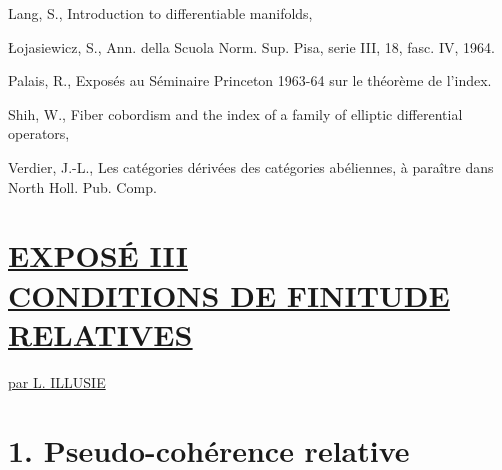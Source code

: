 \documentclass[11pt]{article}
\newcommand{\Spec}{\operatorname{Spec}}
\begin{document}
\providecommand{\ob}{\operatorname{ob}}
\providecommand{\Ob}{\operatorname{ob}}
\begin{enumerate}[label={[\arabic*]}]
\setcounter{enumi}{13}
\item
Lang, S., Introduction to differentiable manifolds,
\item \L{}ojasiewicz, S., Ann. della Scuola Norm. Sup. Pisa, serie III, 18, fasc. IV, 1964.
\item Palais, R., Exposés au Séminaire Princeton 1963-64 sur le théorème de l'index.
\item Shih, W., Fiber cobordism and the index of a family of elliptic differential operators,
\item Verdier, J.-L., Les catégories dérivées des catégories abéliennes, à paraître dans North Holl. Pub. Comp.
\end{enumerate}



\renewcommand{\Ob}{\operatorname{Ob}}
\providecommand{\qcoh}{\mathrm{qcoh}}
\providecommand{\coh}{\mathrm{coh}}
\providecommand{\torf}{\mathrm{torf}}
\providecommand{\toramp}{\operatorname{tor.amp}}
\providecommand{\amp}{\operatorname{amp}}
\providecommand{\Id}{\operatorname{Id}}
\providecommand{\pr}{\operatorname{pr}}
\providecommand{\coker}{\operatorname{coker}}
\providecommand{\im}{\operatorname{Im}}
\providecommand{\Spec}{\operatorname{Spec}}



\section*{\underline{EXPOSÉ III}\\[3pt] \underline{\underline{CONDITIONS DE FINITUDE RELATIVES}}}
\begin{center}
\underline{par L. ILLUSIE}
\end{center}

\section*{1. Pseudo-cohérence relative}
\end{document}

